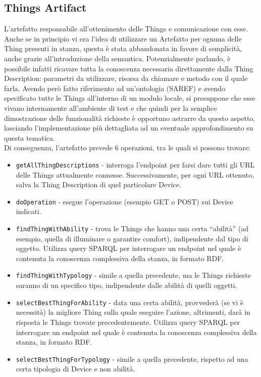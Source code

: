 \documentclass[12pt,a4paper,openright,oneside]{report}
\newcommand{\quotes}[1]{``#1''}
\begin{document}
\subsection{Things Artifact}
L'artefatto responsabile all'ottenimento delle Things e comunicazione con esse. Anche se in principio vi era l'idea di utilizzare un Artefatto per ognuna delle Thing presenti in stanza, questa è stata abbandonata in favore di semplicità, anche grazie all'introduzione della semantica. Potenzialmente parlando, è possibile infatti  ricavare tutta la conoscenza necessaria direttamente dalla Thing Description: parametri da utilizzare, risorsa da chiamare e metodo con il quale farla. Avendo però fatto riferimento ad un'ontologia (SAREF) e avendo specificato tutte le Things all'interno di un modulo locale, si presuppone che esse vivano internamente all'ambiente di test e che quindi per la semplice dimostrazione delle funzionalità richieste è opportuno astrarre da questo aspetto, lasciando l'implementazione più dettagliata ad un eventuale approfondimento su questa tematica.\\

Di conseguenza, l'artefatto prevede 6 operazioni, tra le quali si possono trovare:
\begin{itemize}
	\item \texttt{getAllThingDescriptions} - interroga l'endpoint per farsi dare tutti gli URL delle Things attualmente connesse. Successivamente, per ogni URL ottenuto, salva la Thing Description di quel particolare Device.
	\item \texttt{doOperation} - esegue l'operazione (esempio GET o POST) sui Device indicati.
	\item \texttt{findThingWithAbility} - trova le Things che hanno una certa \quotes{abilità} (ad esempio, quella di illuminare o garantire comfort), indipendente dal tipo di oggetto. Utilizza query SPARQL per interrogare un endpoint nel quale è contenuta la conoscenza complessiva della stanza, in formato RDF.
	\item \texttt{findThingWithTypology} - simile a quella precedente, ma le Things richieste saranno di un specifico tipo, indipendente dalle abilità di quelli oggetti.
	\item \texttt{selectBestThingForAbility} - data una certa abilità, provvederà (se vi è necessità) la migliore Thing sulla quale eseguire l'azione, altrimenti, darà in risposta le Things trovate precedentemente. Utilizza query SPARQL per interrogare un endpoint nel quale è contenuta la conoscenza complessiva della stanza, in formato RDF.
	\item \texttt{selectBestThingForTypology} - simile a quella precedente, rispetto ad una certa tipologia di Device e non abilità.
\end{itemize}
\end{document}
